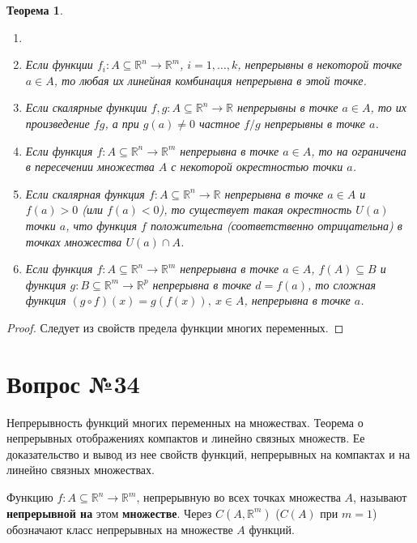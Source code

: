 \documentclass[12pt]{report}
\numberwithin{equation}{section}
\newtheorem{theorem}{Теорема}[section]
\begin{document}
\begin{theorem} \label{th:33:1}
\begin{enumerate}
\item[]
\item[а)] Если функции $f_i : A \subseteq \mathbb{R}^n \to \mathbb{R}^m$, $i = 1, \ldots, k$, непрерывны в некоторой точке $a \in A$, то любая их линейная комбинация непрерывна в этой точке.
\item[б)] Если скалярные функции $f,g : A \subseteq \mathbb{R}^n \to \mathbb{R}$ непрерывны в точке $a \in A$, то их произведение $fg$, а при $g(a) \neq 0$ частное $f/g$ непрерывны в точке $a$. 
\item[в)] Если функция $f : A \subseteq \mathbb{R}^n \to \mathbb{R}^m$ непрерывна в точке $a \in A$, то на ограничена в пересечении множества $A$ с некоторой окрестностью точки $a$.
\item[г)] Если скалярная функция  $f : A \subseteq \mathbb{R}^n \to \mathbb{R}$  непрерывна в точке $a \in A$ и $f(a) > 0$ (или $f(a) < 0$), то существует такая окрестность $U(a)$ точки $a$, что функция $f$ положительна (соответственно отрицательна) в точках множества $U(a) \cap A$. 
\item[д)] Если функция $f : A \subseteq  \mathbb{R}^n \to \mathbb{R}^m$ непрерывна в точке $a \in A$, $f(A) \subseteq B$ и функция $g : B \subseteq \mathbb{R}^m \to \mathbb{R}^p$ непрерывна в точке $d = f(a)$, то сложная функция $(g \circ f)(x) = g(f(x)),~x \in A $, непрерывна в точке $a$.
\end{enumerate}
\end{theorem}
\begin{proof} Следует из свойств предела функции многих переменных.
\end{proof}

\newpage \section{Вопрос №34} %
\begin{framed}
Непрерывность функций многих переменных на множествах. Теорема о непрерывных отображениях компактов и линейно связных множеств. Ее доказательство и вывод из нее свойств функций, непрерывных на компактах и на линейно связных множествах.
\end{framed}

Функцию $f : A \subseteq \mathbb{R}^n \to \mathbb{R}^m$, непрерывную во всех точках множества $A$, называют \textbf{непрерывной на} этом \textbf{множестве}. Через $C(A, \mathbb{R}^m)$ ($C(A)$ при $m = 1$) обозначают класс непрерывных на множестве $A$ функций.
\end{document}
